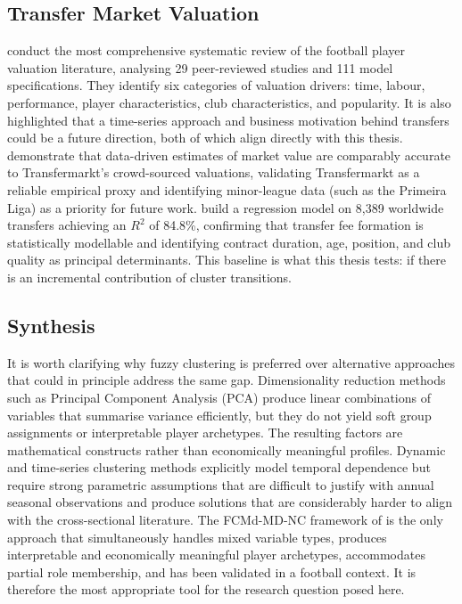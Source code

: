 \documentclass[a4paper,11pt]{report}
\begin{document}
\subsection{Transfer Market Valuation}

\cite{franceschi2024determinants} conduct the most comprehensive systematic review of the football player valuation literature, analysing 29 peer-reviewed studies and 111 model specifications. They identify six categories of valuation drivers: time, labour, performance, player characteristics, club characteristics, and popularity. It is also highlighted that a time-series approach and business motivation behind transfers could be a future direction, both of which align directly with this thesis. \cite{muller2017beyond} demonstrate that data-driven estimates of market value are comparably accurate to Transfermarkt's crowd-sourced valuations, validating Transfermarkt as a reliable empirical proxy and identifying minor-league data (such as the Primeira Liga) as a priority for future work. \cite{poli2024statistical} build a regression model on 8,389 worldwide transfers achieving an $R^2$ of 84.8\%, confirming that transfer fee formation is statistically modellable and identifying contract duration, age, position, and club quality as principal determinants. This baseline is what this thesis tests: if there is an incremental contribution of cluster transitions.

\subsection{Synthesis}

It is worth clarifying why fuzzy clustering is preferred over alternative approaches that could in principle address the same gap. Dimensionality reduction methods such as Principal Component Analysis (PCA) produce linear combinations of variables that summarise variance efficiently, but they do not yield soft group assignments or interpretable player archetypes. The resulting factors are mathematical constructs rather than economically meaningful profiles. Dynamic and time-series clustering methods explicitly model temporal dependence but require strong parametric assumptions that are difficult to justify with annual seasonal observations and produce solutions that are considerably harder to align with the cross-sectional literature. The FCMd-MD-NC framework of \cite{durso2022robust} is the only approach that simultaneously handles mixed variable types, produces interpretable and economically meaningful player archetypes, accommodates partial role membership, and has been validated in a football context. It is therefore the most appropriate tool for the research question posed here.
\end{document}
